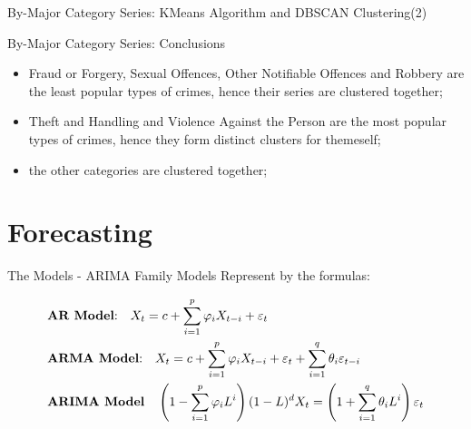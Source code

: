 \documentclass[12pt]{beamer}
\begin{document}
        \begin{frame}{By-Major Category Series: KMeans Algorithm and DBSCAN Clustering(2)}
            \begin{figure}
                \centering
            \end{figure}
        \end{frame}

        \begin{frame}{By-Major Category Series: Conclusions}
            \begin{itemize}
                \item Fraud or Forgery, Sexual Offences, Other Notifiable Offences and Robbery are the least
                popular types of crimes, hence their series are clustered together;
                \item Theft and Handling and Violence Against the Person are the most popular types of
                crimes, hence they form distinct clusters for themeself;
                \item the other categories are clustered together;
            \end{itemize}
        \end{frame}

    \section{Forecasting} %
    \label{sec:forecasting}
        \begin{frame}{The Models - ARIMA Family Models}
            Represent by the formulas:

            \begin{align*}
                &\text{\textbf{AR Model}:} \quad X_t = c + \sum_{i = 1}^{p}\varphi_iX_{t - i} + \varepsilon_t \\
                &\text{\textbf{ARMA Model}:}\quad X_t = c + \sum_{i = 1}^{p}\varphi_iX_{t - i} + \varepsilon_t + \sum_{i = 1}^{q}\theta_i
                \varepsilon_{t - i} \\
                &\text{\textbf{ARIMA Model}} \quad \left ( 1 - \sum_{i=1}^p\varphi_iL^i\right )(1 - L)^dX_t =
                \left ( 1 + \sum_{i = 1}^{q}\theta_iL^i \right ) \varepsilon_t
            \end{align*}

        \end{frame}
\end{document}

